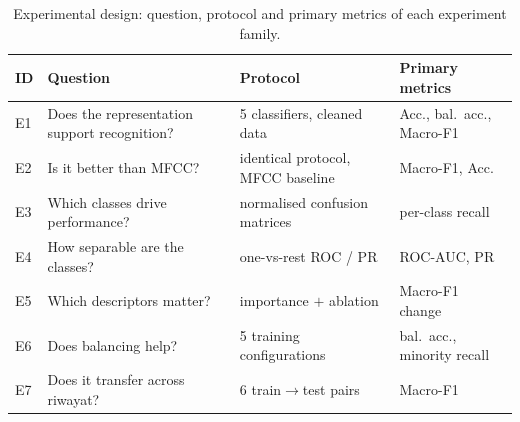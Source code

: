 \documentclass[runningheads]{llncs}
\begin{document}
\begin{table}[t]
\centering
\caption{Experimental design: question, protocol and primary metrics of each
experiment family.}
\label{tab:experiments}
\begin{tabular}{llll}
\hline
ID & Question & Protocol & Primary metrics \\
\hline
E1 & Does the representation support recognition? & 5 classifiers, cleaned data & Acc., bal.\ acc., Macro-F1 \\
E2 & Is it better than MFCC? & identical protocol, MFCC baseline & Macro-F1, Acc. \\
E3 & Which classes drive performance? & normalised confusion matrices & per-class recall \\
E4 & How separable are the classes? & one-vs-rest ROC / PR & ROC-AUC, PR \\
E5 & Which descriptors matter? & importance $+$ ablation & Macro-F1 change \\
E6 & Does balancing help? & 5 training configurations & bal.\ acc., minority recall \\
E7 & Does it transfer across riwayat? & 6 train$\rightarrow$test pairs & Macro-F1 \\
\hline
\end{tabular}
\end{table}
\end{document}

